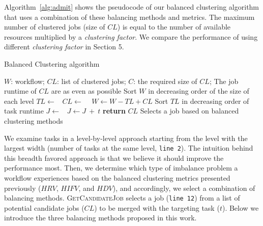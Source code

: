 \documentclass[final]{IEEEtran}
\begin{document}
Algorithm~\ref{alg:admit} shows the pseudocode of our balanced clustering algorithm that uses a combination of these balancing methods and metrics.  The maximum number of clustered jobs (size of $CL$) is equal to the number of available resources multiplied by a \emph{clustering factor}. We compare the performance of using different \emph{clustering factor} in Section 5. 

\begin{algorithm}[htb]
	\caption{ Balanced Clustering algorithm}
	\footnotesize
	\label{alg:admit}
	\begin{algorithmic}[1]
		\Require $W$: workflow; $CL$: list of clustered jobs; $C$: the required size of $CL$; 
		\Ensure The job runtime of $CL$ are as even as possible
			\State Sort $W$ in decreasing order of the size of each level
				\State $TL\gets $\  
				\State $CL\gets$  \  
				\State $W \gets W - TL + CL$   
			\EndFor
		\EndProcedure
			\State Sort $TL$ in decreasing order of task runtime
				\State $J \gets $\  
				\State  $J \gets J\ +\ t$ 
			\EndFor
			\State \textbf{return} $CL$
		\EndProcedure
			\State Selects a job based on balanced clustering methods
		\EndProcedure
	\end{algorithmic}
\end{algorithm}

We examine tasks in a level-by-level approach starting from the level with the largest width (number of tasks at the same level, \texttt{line 2}). The intuition behind this breadth favored approach is that we believe it should improve the performance most. Then, we determine which type of imbalance problem a workflow experiences based on the balanced clustering metrics presented previously ($HRV$, $HIFV$, and $HDV$), and accordingly, we select a combination of balancing methods. \textsc{GetCandidateJob} selects a job (\texttt{line 12}) from a list of potential candidate jobs ($CL$) to be merged with the targeting task ($t$). Below we introduce the three balancing methods proposed in this work.
\end{document}
